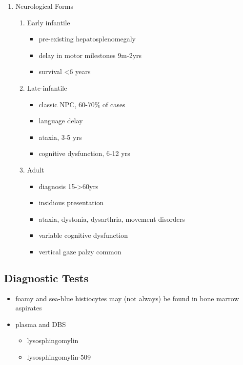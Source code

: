 \documentclass{scrartcl}
\begin{document}
\begin{enumerate}
\item Neurological Forms
\label{sec:orgfe83566}
\begin{enumerate}
\item Early infantile
\label{sec:org7507faa}
\begin{itemize}
\item pre-existing hepatosplenomegaly
\item delay in motor milestones 9m-2yrs
\item survival <6 years
\end{itemize}

\item Late-infantile
\label{sec:orga3750ac}
\begin{itemize}
\item classic NPC, 60-70\% of cases
\item language delay
\item ataxia, 3-5 yrs
\item cognitive dysfunction, 6-12 yrs
\end{itemize}

\item Adult
\label{sec:org6e2e458}
\begin{itemize}
\item diagnosis 15->60yrs
\item insidious presentation
\item ataxia, dystonia, dysarthria, movement disorders
\item variable cognitive dysfunction
\item vertical gaze palzy common
\end{itemize}
\end{enumerate}
\end{enumerate}

\subsection{Diagnostic Tests}
\label{sec:orgda74ca9}
\begin{itemize}
\item foamy and sea-blue histiocytes may (not always) be found in bone
marrow aspirates

\item plasma and DBS
\begin{itemize}
\item lysosphingomylin
\item lysosphingomylin-509
\end{itemize}
\end{itemize}
\end{document}
